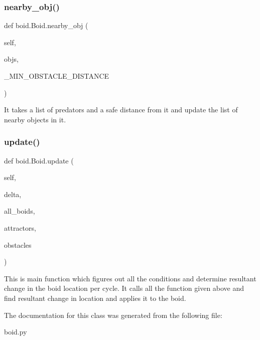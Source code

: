 \subsubsection{\texorpdfstring{nearby\+\_\+obj()}{nearby\_obj()}}
{\footnotesize\ttfamily def boid.\+Boid.\+nearby\+\_\+obj (\begin{DoxyParamCaption}\item[{}]{self,  }\item[{}]{objs,  }\item[{}]{\+\_\+\+M\+I\+N\+\_\+\+O\+B\+S\+T\+A\+C\+L\+E\+\_\+\+D\+I\+S\+T\+A\+N\+CE }\end{DoxyParamCaption})}

\begin{DoxyVerb}It takes a list of predators and a safe distance from it and update the list of nearby objects in it.\end{DoxyVerb}
 \mbox{\label{classboid_1_1Boid_a8785ce00989f8a785bac850dc2455471}} 
\subsubsection{\texorpdfstring{update()}{update()}}
{\footnotesize\ttfamily def boid.\+Boid.\+update (\begin{DoxyParamCaption}\item[{}]{self,  }\item[{}]{delta,  }\item[{}]{all\+\_\+boids,  }\item[{}]{attractors,  }\item[{}]{obstacles }\end{DoxyParamCaption})}

\begin{DoxyVerb}This is main function which figures out all the conditions and determine resultant change in the boid location per cycle. It calls all the function given above and find resultant change in location and applies it to the boid.\end{DoxyVerb}
 

The documentation for this class was generated from the following file\+:\begin{DoxyCompactItemize}
\item 
boid.\+py\end{DoxyCompactItemize}
